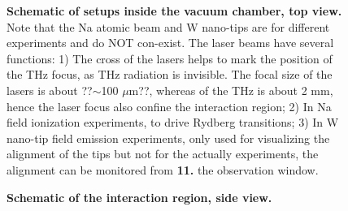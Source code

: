 \begin{figure}
	\centering
	\caption[Schematic of setups inside the vacuum chamber, top view.]{{\bf Schematic of setups inside the vacuum chamber, top view.} Note that the Na atomic beam and W nano-tips are for different experiments and do NOT con-exist. The laser beams have several functions: 1) The cross of the lasers helps to mark the position of the THz focus, as THz radiation is invisible. The focal size of the lasers is about ??$\sim$100 $\mu$m??, whereas of the THz is about 2 mm, hence the laser focus also confine the interaction region; 2) In Na field ionization experiments, to drive Rydberg transitions; 3) In W nano-tip field emission experiments, only used for visualizing the alignment of the tips but not for the actually experiments, the alignment can be monitored from {\bf 11.} the observation window.}
	\label{fig:Chamber}
\end{figure}

\begin{figure}
	\centering
	\caption[Schematic of the interaction region, side view.]{{\bf Schematic of the interaction region, side view.}}
	\label{fig:InteractionRegion}	
\end{figure}

